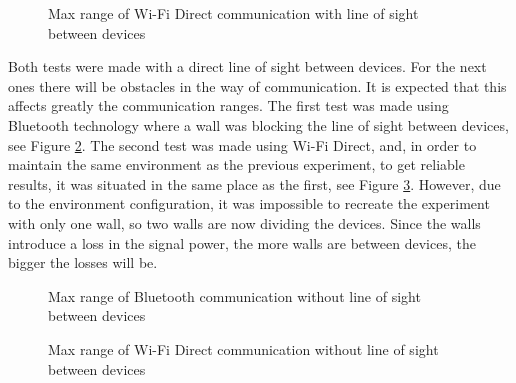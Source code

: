 \begin{figure}[ht]
   \noindent{}
	\caption{\label{fig:wfdMaxVisib} Max range of Wi-Fi Direct communication with line of sight between devices}
\end{figure}

Both tests were made with a direct line of sight between devices. For the next ones there will be obstacles in the way of communication. It is expected that this affects greatly the communication ranges. The first test was made using Bluetooth technology where a wall was blocking the line of sight between devices, see Figure \ref{fig:btMaxInv}. The second test was made using Wi-Fi Direct, and, in order to maintain the same environment as the previous experiment, to get reliable results, it was situated in the same place as the first, see Figure \ref{fig:wfdMaxInv}. However, due to the environment configuration, it was impossible to recreate the experiment with only one wall, so two walls are now dividing the devices. Since the walls introduce a loss in the signal power, the more walls are between devices, the bigger the losses will be.

\begin{figure}[ht]
   \noindent{}
	\caption{\label{fig:btMaxInv} Max range of Bluetooth communication without line of sight between devices}
\end{figure}

\begin{figure}[ht]
   \noindent{}
	\caption{\label{fig:wfdMaxInv} Max range of Wi-Fi Direct communication without line of sight between devices}
\end{figure}

